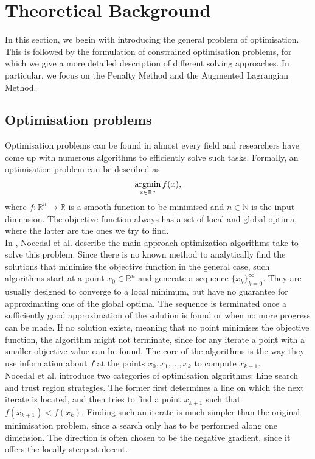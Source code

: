 \label{section:theoreticalBackground}
\section{Theoretical Background}
In this section, we begin with introducing the general problem of optimisation. This is followed by the formulation of constrained optimisation problems, for which we give a more detailed description of different solving approaches. In particular, we focus on the Penalty Method and the Augmented Lagrangian Method.
\subsection{Optimisation problems}
Optimisation problems can be found in almost every field and researchers have come up with numerous algorithms to efficiently solve such tasks. Formally, an optimisation problem can be described as 
\[\operatorname*{argmin}_{x \in \mathbb{R}^n} f(x),\]
where $f\colon \mathbb{R}^n\to \mathbb{R}$ is a smooth function to be minimised and $n \in \mathbb{N}$ is the input dimension. The objective function always has a set of local and global optima, where the latter are the ones we try to find.\\
In \cite{NoceWrig06}, Nocedal et al. describe the main approach optimization algorithms take to solve this problem. Since there is no known method to analytically find the solutions that minimise the objective function in the general case, such algorithms start at a point $x_0 \in \mathbb{R}^n$ and generate a sequence $\{x_k\}_{k=0}^\infty$. They are usually designed to converge to a local minimum, but have no guarantee for approximating one of the global optima. The sequence is terminated once a sufficiently good approximation of the solution is found or when no more progress can be made. If no solution exists, meaning that no point minimises the objective function, the algorithm might not terminate, since for any iterate a point with a smaller objective value can be found. The core of the algorithms is the way they use information about $f$ at the points $x_0, x_1, ..., x_k$ to compute $x_{k+1}$. \\
\indent Nocedal et al. introduce two categories of optimisation algorithms: Line search and trust region strategies. The former first determines a line on which the next iterate is located, and then tries to find a point $x_{k+1}$ such that $f(x_{k+1}) < f(x_k)$. Finding such an iterate is much simpler than the original minimisation problem, since a search only has to be performed along one dimension. The direction is often chosen to be the negative gradient, since it offers the locally steepest decent. 

